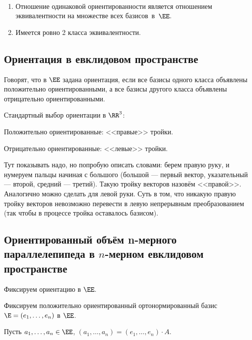 \begin{exercise}~
    \begin{enumerate}
    \item 
        Отношение одинаковой ориентированности является отношением эквивалентности на множестве всех базисов~в~$\EE$.
    \item 
        Имеется ровно 2 класса эквивалентности.
    \end{enumerate}
\end{exercise}


\subsection{Ориентация в евклидовом пространстве}

\begin{definition}
    Говорят, что в $\EE$ задана ориентация, если все базисы одного класса объявлены положительно ориентированными, а все базисы другого класса объявлены отрицательно ориентированными.
\end{definition}

\begin{example}
    Стандартный выбор ориентации в $\RR^3$:

    Положительно ориентированные: <<правые>> тройки.

    Отрицательно ориентированные: <<левые>> тройки.

    \bigskip
    Тут показывать надо, но попробую описать словами: берем правую руку, и нумеруем пальцы начиная с большого (большой --- первый вектор, указательный --- второй, средний --- третий). Такую тройку векторов назовём <<правой>>. Аналогично можно сделать для левой руки. Суть в том, что никакую правую тройку векторов невозможно перевести в левую непрерывным преобразованием (так чтобы в процессе тройка оставалось базисом).
\end{example}


\subsection{Ориентированный объём n-мерного параллелепипеда в $n$-мерном евклидовом пространстве}

Фиксируем ориентацию в $\EE$.

Фиксируем положительно ориентированный ортонормированный базис $\E = (e_1, \dots, e_n)$ в $\EE$.

Пусть $a_1, \dots, a_n \in \EE$, $(a_1, \dots, a_n) = (e_1, \dots, e_n) \cdot A$.

